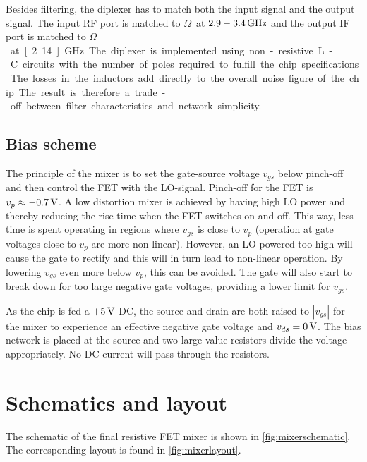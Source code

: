 			Besides  filtering, the diplexer has to match  both the input signal and the output signal. The input RF port is matched to \unit[50]{$\Omega$} at $\unit[2.9-3.4]{GHz}$ and the output IF port is matched to \unit[50]{$\Omega$} at \unit[2.14]{GHz}.

			The diplexer is implemented using non-resistive L-C circuits with the number of poles required to fulfill the chip specifications. The losses in the inductors add directly to the overall noise figure of the chip. The result is therefore a trade-off between filter characteristics and network simplicity.

		\subsection{Bias scheme}\label{sec:mixerbias}
			The principle of the mixer is to set the gate-source voltage $v_{gs}$ below pinch-off and then control the FET with the LO-signal. Pinch-off for the FET is $v_p\approx \unit[-0.7]{V}$. A low distortion mixer is achieved by having high LO power and thereby reducing the rise-time when the FET switches on and off. This way, less time is spent operating in regions where $v_{gs}$ is close to $v_p$ (operation at gate voltages close to $v_p$ are more non-linear). However, an LO powered too high will cause the gate to rectify and this will in turn lead to non-linear operation.\autocite{maas98} By lowering $v_{gs}$ even more below $v_p$, this can be avoided. The gate will also start to break down for too large negative gate voltages, providing a lower limit for $v_{gs}$.

			As the chip is fed a $+\unit[5]{V}$ DC, the source and drain are both raised to $|v_{gs}|$ for the mixer to experience an effective negative gate voltage and $v_{ds}=\unit[0]{V}$. The bias network is placed at the source and two large value resistors divide the voltage appropriately. No DC-current will pass through the resistors.

	\section{Schematics and layout}
		The schematic of the final resistive FET mixer is shown in \autoref{fig:mixerschematic}. The corresponding layout is found in \autoref{fig:mixerlayout}.

